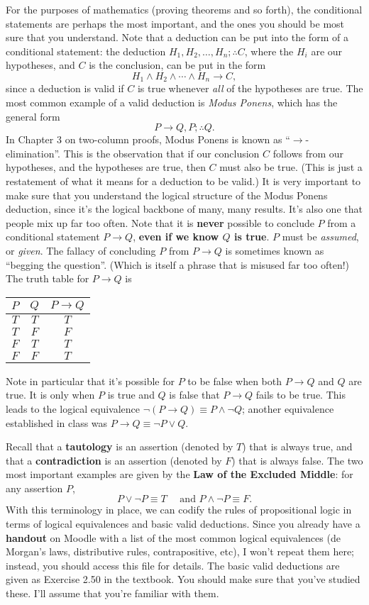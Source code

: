 \documentclass[letterpaper,12pt]{article}
\begin{document}
For the purposes of mathematics (proving theorems and so forth), the conditional statements are perhaps the most important, and the ones you should be most sure that you understand. Note that a deduction can be put into the form of a conditional statement: the deduction $H_1,H_2,\ldots, H_n;\therefore C$, where the $H_i$ are our hypotheses, and $C$ is the conclusion, can be put in the form
\[
 H_1\wedge H_2\wedge \cdots \wedge H_n \to C,
\]
since a deduction is valid if $C$ is true whenever {\em all} of the hypotheses are true. The most common example of a valid deduction is {\em Modus Ponens}, which has the general form
\[
 P\to Q, P; \therefore Q.
\]
In Chapter 3 on two-column proofs, Modus Ponens is known as ``$\to$-elimination''. This is the observation that if our conclusion $C$ follows from our hypotheses, and the hypotheses are true, then $C$ must also be true. (This is just a restatement of what it means for a deduction to be valid.) It is very important to make sure that you understand the logical structure of the Modus Ponens deduction, since it's the logical backbone of many, many results. It's also one that people mix up far too often. Note that it is {\bf never} possible to conclude $P$ from a conditional statement $P\to Q$, {\bf even if we know $Q$ is true}. $P$ must be {\em assumed}, or {\em given}. The fallacy of concluding $P$ from $P\to Q$ is sometimes known as ``begging the question''. (Which is itself a phrase that is misused far too often!) The truth table for $P\to Q$ is
\begin{center}
 \begin{tabular}{|c|c|c|}
  \hline
$P$ & $Q$ & $P\to Q$\\
\hline
$T$ & $T$ & $T$\\
$T$ & $F$ & $F$\\
$F$ & $T$ & $T$\\
$F$ & $F$ & $T$\\
\hline
 \end{tabular}
\end{center}
Note in particular that it's possible for $P$ to be false when both $P\to Q$ and $Q$ are true. It is only when $P$ is true and $Q$ is false that $P\to Q$ fails to be true. This leads to the logical equivalence $\neg (P\to Q) \equiv P\wedge \neg Q$; another equivalence established in class was $P\to Q\equiv \neg P\vee Q$. 

Recall that a {\bf tautology} is an assertion (denoted by $T$) that is always true, and that a {\bf contradiction} is an assertion (denoted by $F$) that is always false. The two most important examples are given by the {\bf Law of the Excluded Middle}: for any assertion $P$,
\[
 P\vee \neg P \equiv T\quad \text{ and } P\wedge \neg P \equiv F.
\]
With this terminology in place, we can codify the rules of propositional logic in terms of logical equivalences and basic valid deductions. Since you already have a {\bf handout} on Moodle with a list of the most common logical equivalences (de Morgan's laws, distributive rules, contrapositive, etc), I won't repeat them here; instead, you should access this file for details. The basic valid deductions are given as Exercise 2.50 in the textbook. You should make sure that you've studied these. I'll assume that you're familiar with them.
\end{document}
